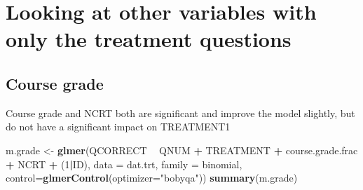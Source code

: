 \documentclass[]{article}
\newenvironment{Shaded}{\begin{snugshade}}{\end{snugshade}}
\newcommand{\KeywordTok}[1]{\textcolor[rgb]{0.13,0.29,0.53}{\textbf{#1}}}
\newcommand{\DataTypeTok}[1]{\textcolor[rgb]{0.13,0.29,0.53}{#1}}
\newcommand{\DecValTok}[1]{\textcolor[rgb]{0.00,0.00,0.81}{#1}}
\newcommand{\StringTok}[1]{\textcolor[rgb]{0.31,0.60,0.02}{#1}}
\newcommand{\OperatorTok}[1]{\textcolor[rgb]{0.81,0.36,0.00}{\textbf{#1}}}
\newcommand{\NormalTok}[1]{#1}
\begin{document}
\section{Looking at other variables with only the treatment
questions}\label{looking-at-other-variables-with-only-the-treatment-questions}

\subsection{Course grade}\label{course-grade}

Course grade and NCRT both are significant and improve the model
slightly, but do not have a significant impact on TREATMENT1

\begin{Shaded}
\begin{Highlighting}[]
\NormalTok{m.grade <-}\StringTok{ }\KeywordTok{glmer}\NormalTok{(QCORRECT }\OperatorTok{~}\StringTok{ }\NormalTok{QNUM }\OperatorTok{+}\StringTok{ }\NormalTok{TREATMENT }\OperatorTok{+}\StringTok{ }\NormalTok{course.grade.frac }\OperatorTok{+}\StringTok{ }\NormalTok{NCRT }\OperatorTok{+}\StringTok{ }\NormalTok{(}\DecValTok{1}\OperatorTok{|}\NormalTok{ID), }
                \DataTypeTok{data =}\NormalTok{ dat.trt, }
                \DataTypeTok{family =}\NormalTok{ binomial, }\DataTypeTok{control=}\KeywordTok{glmerControl}\NormalTok{(}\DataTypeTok{optimizer=}\StringTok{"bobyqa"}\NormalTok{))}
\KeywordTok{summary}\NormalTok{(m.grade)}
\end{Highlighting}
\end{Shaded}
\end{document}
